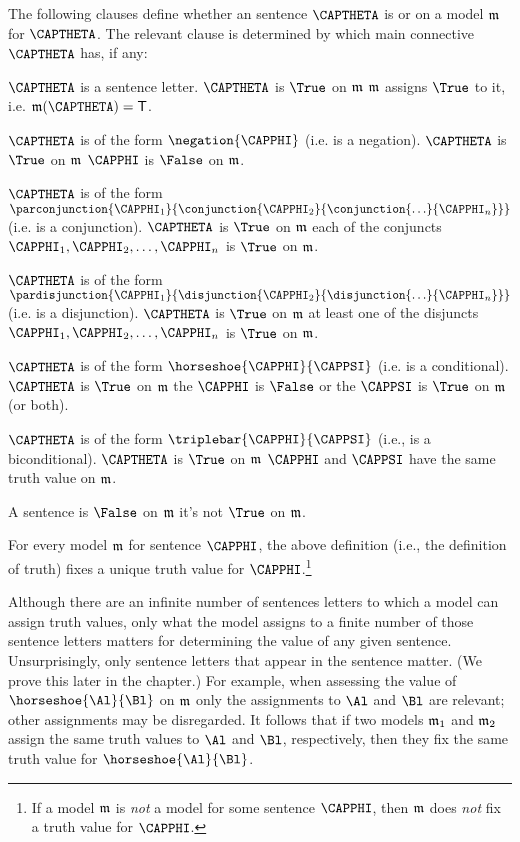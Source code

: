 \begin{majorILnc}{} The following clauses define whether an \GSL{} sentence $\CAPTHETA$ is \nidf{$\True$} or \nidf{$\False$} on a model $\mathfrak{m}$ for $\CAPTHETA$. The relevant clause is determined by which main connective $\CAPTHETA$ has, if any:
\begin{cenumerate}
\item $\CAPTHETA$ is a sentence letter. $\CAPTHETA$ is $\True$ on $\mathfrak{m}$ \Iff $\mathfrak{m}$ assigns $\True$ to it, i.e. $\IntA(\CAPTHETA)=\TrueB$.
\item $\CAPTHETA$ is of the form $\negation{\CAPPHI}$ (i.e. is a negation). $\CAPTHETA$ is $\True$ on $\mathfrak{m}$ \Iff $\CAPPHI$ is $\False$ on $\mathfrak{m}$.
\item\label{GSL true conjunction} $\CAPTHETA$ is of the form $\parconjunction{\CAPPHI_1}{\conjunction{\CAPPHI_2}{\conjunction{\ldots}{\CAPPHI_{\integer{n}}}}}$ (i.e. is a conjunction).   $\CAPTHETA$ is $\True$ on $\mathfrak{m}$ \Iff each of the conjuncts $\CAPPHI_1, \CAPPHI_2, \ldots, \CAPPHI_n$ is $\True$ on $\mathfrak{m}$.
\item $\CAPTHETA$ is of the form $\pardisjunction{\CAPPHI_1}{\disjunction{\CAPPHI_2}{\disjunction{\ldots}{\CAPPHI_{\integer{n}}}}}$ (i.e. is a disjunction). $\CAPTHETA$ is $\True$ on $\mathfrak{m}$ \Iff at least one of the disjuncts $\CAPPHI_1, \CAPPHI_2, \ldots, \CAPPHI_n$ is $\True$ on $\mathfrak{m}$.
\item\label{GSL true horseshoe} $\CAPTHETA$ is of the form $\horseshoe{\CAPPHI}{\CAPPSI}$ (i.e. is a conditional). $\CAPTHETA$ is $\True$ on $\mathfrak{m}$ \Iff the  $\CAPPHI$ is $\False$ or the  $\CAPPSI$ is $\True$ on $\mathfrak{m}$ (or both).
\item $\CAPTHETA$ is of the form $\triplebar{\CAPPHI}{\CAPPSI}$ (i.e., is a biconditional). $\CAPTHETA$ is $\True$ on $\mathfrak{m}$ \Iff $\CAPPHI$ and $\CAPPSI$ have the same truth value on $\mathfrak{m}$.
\item A sentence is $\False$ on $\mathfrak{m}$ \Iff it's not $\True$ on $\mathfrak{m}$.
\end{cenumerate}
\end{majorILnc}

For every model $\mathfrak{m}$ for sentence $\CAPPHI$, the above definition (i.e., the definition of truth) fixes a unique truth value for $\CAPPHI$.\footnote{If a model $\mathfrak{m}$ is \emph{not} a model for some \GSL{} sentence $\CAPPHI$, then $\mathfrak{m}$ does \emph{not} fix a truth value for $\CAPPHI$.}

Although there are an infinite number of \GSL{} sentences letters to which a model can assign truth values, only what the model assigns to a finite number of those sentence letters matters for determining the value of any given sentence.  
Unsurprisingly, only sentence letters that appear in the sentence matter. (We prove this later in the chapter.) 
For example, when assessing the value of $\horseshoe{\Al}{\Bl}$ on $\mathfrak{m}$ only the assignments to $\Al$ and $\Bl$ are relevant; other assignments may be disregarded. It follows that if two models $\mathfrak{m}_1$ and $\mathfrak{m}_2$ assign the same truth values to $\Al$ and $\Bl$, respectively, then they fix the same truth value for $\horseshoe{\Al}{\Bl}$. 

